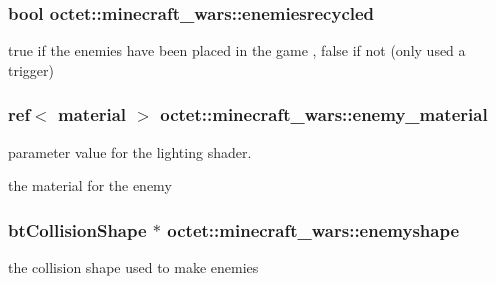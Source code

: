 \hypertarget{classoctet_1_1minecraft__wars_a0244d8a261eaeb616479c64ad2c0aab5}{
\subsubsection[{enemiesrecycled}]{\setlength{\rightskip}{0pt plus 5cm}bool octet\+::minecraft\+\_\+wars\+::enemiesrecycled\hspace{0.3cm}{\ttfamily [private]}}}\label{classoctet_1_1minecraft__wars_a0244d8a261eaeb616479c64ad2c0aab5}


true if the enemies have been placed in the game , false if not (only used a trigger) 

\hypertarget{classoctet_1_1minecraft__wars_a4a9ebbe5825e5da5c6357718194e3d7e}{
\subsubsection[{enemy\+\_\+material}]{\setlength{\rightskip}{0pt plus 5cm}ref$<$ material $>$ octet\+::minecraft\+\_\+wars\+::enemy\+\_\+material\hspace{0.3cm}{\ttfamily [private]}}}\label{classoctet_1_1minecraft__wars_a4a9ebbe5825e5da5c6357718194e3d7e}


parameter value for the lighting shader. 

the material for the enemy \hypertarget{classoctet_1_1minecraft__wars_aa3d199d2f6084140c89c884bb079fb7b}{
\subsubsection[{enemyshape}]{\setlength{\rightskip}{0pt plus 5cm}bt\+Collision\+Shape $\ast$ octet\+::minecraft\+\_\+wars\+::enemyshape\hspace{0.3cm}{\ttfamily [private]}}}\label{classoctet_1_1minecraft__wars_aa3d199d2f6084140c89c884bb079fb7b}


the collision shape used to make enemies 

